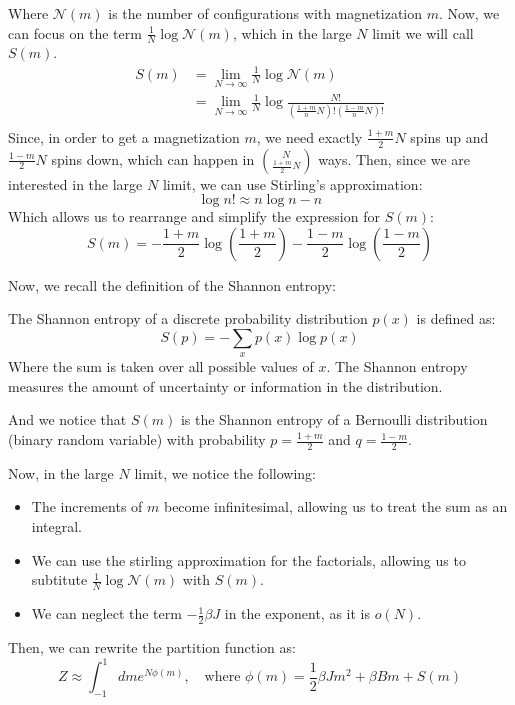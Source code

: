 Where $\mathcal{N}(m)$ is the number of configurations with magnetization $m$. Now, we can focus on the term $\frac{1}{N} \log\mathcal{N}(m)$, which in the large $N$ limit we will call $S(m)$.
\begin{equation}
    \begin{aligned}
        S(m) &= \lim_{N \rightarrow \infty}\frac{1}{N}\log\mathcal{N}(m)\\
        &= \lim_{N \rightarrow \infty}\frac{1}{N}\log \frac{N!}{\left(\frac{1+m}{n}N\right)!\left(\frac{1-m}{n}N\right)!}\\
    \end{aligned}
\end{equation}
Since, in order to get a magnetization $m$, we need exactly $\frac{1+m}{2}N$ spins up and $\frac{1-m}{2}N$ spins down, which can happen in $\binom{N}{\frac{1+m}{2}N}$ ways. Then, since we are interested in the large $N$ limit, we can use Stirling's approximation:
\begin{equation}
    \log n! \approx n\log n - n
\end{equation}
Which allows us to rearrange and simplify the expression for $S(m)$:
\begin{equation}
    S(m) = -\frac{1+m}{2}\log\left(\frac{1+m}{2}\right) - \frac{1-m}{2}\log\left(\frac{1-m}{2}\right)
\end{equation}

Now, we recall the definition of the Shannon entropy:
\begin{definition}
    The Shannon entropy of a discrete probability distribution $p(x)$ is defined as:
    \begin{equation}
        S(p) = -\sum_x p(x)\log p(x)
    \end{equation}
    Where the sum is taken over all possible values of $x$.
    The Shannon entropy measures the amount of uncertainty or information in the distribution.
\end{definition}

And we notice that $S(m)$ is the Shannon entropy of a Bernoulli distribution (binary random variable) with probability $p = \frac{1+m}{2}$ and $q = \frac{1-m}{2}$.

Now, in the large $N$ limit, we notice the following:
\begin{itemize}
    \item The increments of $m$ become infinitesimal, allowing us to treat the sum as an integral.
    \item We can use the stirling approximation for the factorials, allowing us to subtitute $\frac{1}{N}\log\mathcal{N}(m)$ with $S(m)$.
    \item We can neglect the term $-\frac{1}{2}\beta J$ in the exponent, as it is $o(N)$.
\end{itemize}
Then, we can rewrite the partition function as:
\begin{equation}
    \label{eq:curie_weiss_phi}
    Z \approx \int_{-1}^{1} dm e^{N\phi(m)}, \quad \text{where }
    \phi(m) = \frac{1}{2}\beta J m^2 + \beta B m + S(m)
\end{equation}

